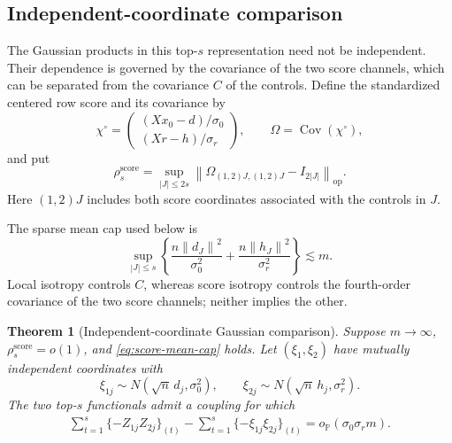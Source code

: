 \documentclass[a4paper,11pt,english]{article}
\newtheorem{theorem}{Theorem}[section]
\newcommand{\Prob}{\mathbb P}
\newcommand{\Cov}{\operatorname{Cov}}
\newcommand{\norm}[1]{\left\lVert #1\right\rVert}
\begin{document}
\subsection{Independent-coordinate comparison}

The Gaussian products in this top-$s$ representation need not be
independent.
Their dependence is governed by the covariance of the two score
channels, which can be separated from the covariance $C$ of the controls.
Define the standardized centered row score and its covariance by
\begin{equation}\label{eq:score-covariance}
        \chi^\circ=
        \begin{pmatrix}
        (Xx_0-d)/\sigma_0\\
        (Xr-h)/\sigma_r
        \end{pmatrix},
        \qquad \Omega=\Cov(\chi^\circ),
\end{equation}
and put
\begin{equation}\label{eq:score-isotropy}
        \rho_s^{\mathrm{score}}
        =\sup_{|J|\le2s}
        \norm{\Omega_{(1,2)J,(1,2)J}-I_{2|J|}}_{\mathrm{op}}.
\end{equation}
Here $(1,2)J$ includes both score coordinates associated with the
controls in $J$.

The sparse mean cap used below is
\begin{equation}\label{eq:score-mean-cap}
        \sup_{|J|\le s}\left\{
        \frac{n\norm{d_J}^2}{\sigma_0^2}
        +\frac{n\norm{h_J}^2}{\sigma_r^2}
        \right\}\lesssim m.
\end{equation}
Local isotropy controls $C$, whereas score isotropy controls the
fourth-order covariance of the two score channels; neither implies the
other.

\begin{theorem}[Independent-coordinate Gaussian comparison]
\label{thm:gaussian-top-s-decoupling}
Suppose $m\to\infty$, $\rho_s^{\mathrm{score}}=o(1)$, and
\eqref{eq:score-mean-cap} holds.
Let $(\xi_1,\xi_2)$ have mutually independent coordinates with
\begin{equation*}
        \xi_{1j}\sim N(\sqrt n\,d_j,\sigma_0^2),
        \qquad
        \xi_{2j}\sim N(\sqrt n\,h_j,\sigma_r^2).
\end{equation*}
The two top-$s$ functionals admit a coupling for which
\begin{equation}\label{eq:gaussian-score-decoupling}
\begin{split}
        \sum_{t=1}^s\{-Z_{1j}Z_{2j}\}_{(t)}
        -\sum_{t=1}^s\{-\xi_{1j}\xi_{2j}\}_{(t)}
        =o_{\Prob}(\sigma_0\sigma_r m).
\end{split}
\end{equation}
\end{theorem}
\end{document}
